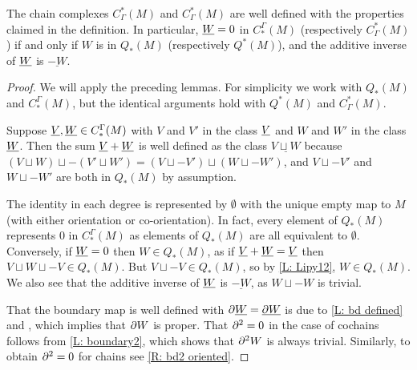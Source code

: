 \begin{lemma}\label{L: co/chains well defined}
	The chain complexes $C_\Gamma^*(M)$ and $C_\Gamma^*(M)$ are well defined with the properties claimed in the definition. 
	In particular, $\underline{W} = 0$ in $C^\Gamma_*(M)$ (respectively $C_\Gamma^*(M)$) if and only if $W$ is in $Q_*(M)$ (respectively $Q^*(M)$), and the additive inverse of $\underline{W}$ is $\underline{-W}$. 
\end{lemma}

\begin{proof}
	We will apply the preceding lemmas.
	For simplicity we work with $Q_*(M)$ and $C^\Gamma_*(M)$, but the identical arguments hold with $Q^*(M)$ and $C_\Gamma^*(M)$.

	Suppose $\underline{V},\underline{W} \in C^\Gamma_*(M)$ with $V$ and $V'$ in the class $\underline{V}$ and $W$ and $W'$ in the class $\underline{W}$.
	Then the sum $\underline{V}+\underline{W}$ is well defined as the class $\underline{V \sqcup W}$ because $(V \sqcup W) \sqcup -(V' \sqcup W') = (V \sqcup -V') \sqcup (W \sqcup -W')$, and $V \sqcup -V'$ and  $W \sqcup -W'$ are both in $Q_*(M)$ by assumption. 

	The identity in each degree is represented by $\emptyset$ with the unique empty map to $M$ (with either orientation or co-orientation).
	In fact, every element of $Q_*(M)$ represents $0$ in $C^\Gamma_*(M)$ as elements of $Q_*(M)$ are all equivalent to $\emptyset$.
	Conversely, if $\underline{W} = 0$ then $W \in Q_*(M)$, as if $\underline{V}+\underline{W} = \underline{V}$ then $V \sqcup W \sqcup -V \in Q_*(M)$.
	But $V \sqcup -V \in Q_*(M)$, so by \cref{L: Lipy12}, $W \in Q_*(M)$.
	We also see that the additive inverse of $\underline{W}$ is $\underline{-W}$, as $W \sqcup -W$ is trivial.

	That the boundary map is well defined with $\partial \underline{W} = \underline{\partial W}$ is due to \cref{L: bd defined} and \cite[Lemma 2.8]{Joy12}, which implies that $\partial W$ is proper.
	That $\partial^2 = 0$ in the case of cochains follows from \cref{L: boundary2}, which shows that $\partial^2 W$ is always trivial.
	Similarly, to obtain $\partial^2 = 0$ for chains see \cref{R: bd2 oriented}.
\end{proof}

\begin{comment}
	Thom deeply considered the interplay between manifolds
	and homology \cite{Thom54}, and the cohomology classes we produce for submanifolds are equal to the pullbacks of Thom classes by Thom collapse maps.
	Similar objects were defined by Quillen \cite{Quil71} as an immediate translation of the data which encodes cobordism generalized cohomology theories.
	Thus, we name the QT-objects which represent equivalence classes of geometric cochains, defined below, in honor of Quillen and Thom.
\end{comment}

